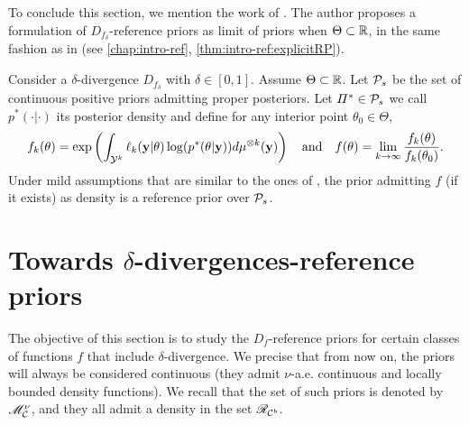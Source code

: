 To conclude this section, we mention the work of \citet{le_formal_2014}. The author proposes a formulation of  $D_{f_\delta}$-reference priors as limit of priors when $\Theta\subset\mathbb{R}$, in the same fashion as in \cite{berger_formal_2009} (see \cref{chap:intro-ref}, \cref{thm:intro-ref:explicitRP}).
\begin{thm}
    Consider a $\delta$-divergence $D_{f_\delta}$ with $\delta\in[0,1]$. Assume $\Theta\subset\mathbb{R}$. Let $\mathcal{P}_s$ be the set of continuous positive priors admitting proper posteriors.
%
    Let $\varPi^\ast\in\mathcal{P}_s$ we call $p^\ast(\cdot|\cdot)$ its posterior density and define for any interior point $\theta_0\in\Theta$,
        \begin{equation}
                f_k(\theta) = \exp\left(\int_{\cY^k}\ell_k(\mbf y|\theta)\log(p^\ast(\theta|\mbf y)) d\mu^{\otimes k}(\mbf y) \right) \quad\text{and}\quad  %
                f(\theta) = \lim_{k\rightarrow\infty}\frac{f_k(\theta)}{f_k(\theta_0)}.
        \end{equation}
        Under mild assumptions that are similar to the ones of \cite{berger_formal_2009}, the prior admitting $f$ (if it exists) as density is a reference prior over $\mathcal{P}_s$.
\end{thm}



\section{Towards $\delta$-divergences-reference priors}
\label{sec:PSGSA:towardsdelta}

The objective of this section is to study the $D_f$-reference priors for certain classes of functions $f$ that include  $\delta$-divergence.
We precise that from now on, the priors will always be considered continuous (they admit $\nu$-a.e. continuous  and locally bounded density functions). We recall that the set of such priors is denoted by $\mathscr{M}^\nu_{\mathcal{C}} $, and they all admit a density in the set $\mathscr{R}_{\mathcal{C}^b}$. %

